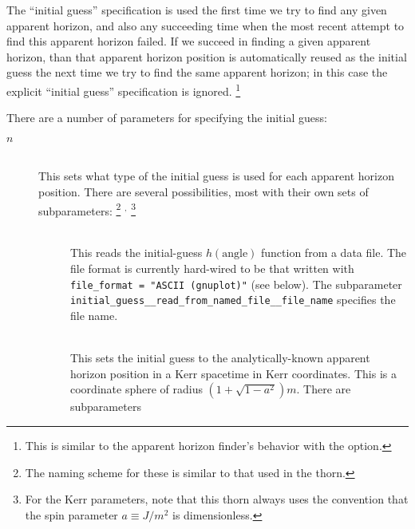The ``initial guess'' specification is used the first time we try to
find any given apparent horizon, and also any succeeding time when the
most recent attempt to find this apparent horizon failed.  If we succeed
in finding a given apparent horizon, than that apparent horizon position
is automatically reused as the initial guess the next time we try to
find the same apparent horizon; in this case the explicit ``initial guess''
specification is ignored.%
\footnote{%
	 This is similar to the  apparent
	 horizon finder's behavior with the
	 option.
	 }%

There are a number of parameters for specifying the initial guess:
\begin{description}
\item[\code{initial\_guess\_method[}$n$\code{]}]
\mbox{}\\
	This sets what type of the initial guess is used for each
	apparent horizon position.
	There are several possibilities, most with their own sets
	of subparameters:%
\footnote{%
	 The naming scheme for these is similar to
	 that used in the  thorn.
	 }%
$^,$%
\footnote{%
	 For the Kerr parameters, note that this thorn
	 always uses the convention that the spin parameter
	 $a \equiv J/m^2$ is dimensionless.
	 }%
	\begin{description}
	\item[]
	\mbox{}\\
		This reads the initial-guess $h(\text{angle})$ function
		from a data file.  The file format is currently hard-wired
		to be that written with \verb|file_format = "ASCII (gnuplot)"|
		(see below).  The subparameter
		\verb|initial_guess__read_from_named_file__file_name|
		specifies the file name.
	\item[]
	\mbox{}\\
		This sets the initial guess to the analytically-known
		apparent horizon position in a Kerr spacetime
		in Kerr coordinates.  This is a coordinate sphere
		of radius $(1 + \sqrt{1 - a^2}) m$.
		There are subparameters
		\begin{description}
		\item[%
		     \begin{tabular}{@{}l@{}}
		     \code{initial\_guess\_\_Kerr\_Kerr\_\_x\_posn[}$n$\code{]} \\
		     \code{initial\_guess\_\_Kerr\_Kerr\_\_y\_posn[}$n$\code{]} \\
		     \code{initial\_guess\_\_Kerr\_Kerr\_\_z\_posn[}$n$\code{]} %

\end{tabular}
\end{description}
\end{description}
\end{description}
